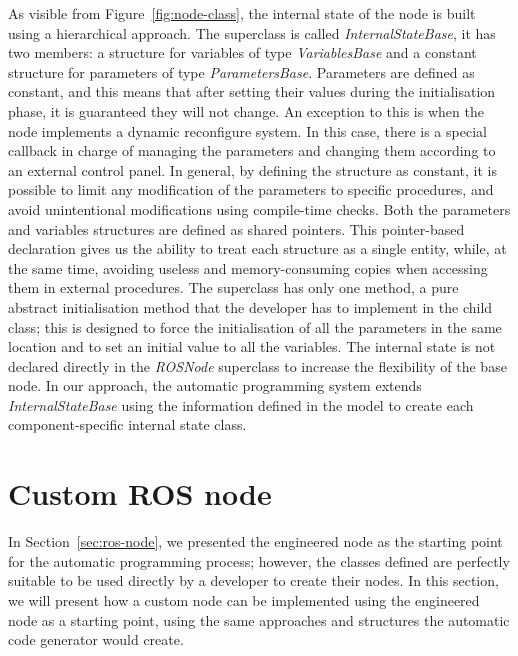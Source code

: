 As visible from Figure~\ref{fig:node-class}, the internal state of the node is built using a hierarchical approach. The superclass is called \textit{InternalStateBase}, it has two members: a structure for variables of type \textit{VariablesBase} and a constant structure for parameters of type  \textit{ParametersBase}. Parameters are defined as constant, and this means that after setting their values during the initialisation phase, it is guaranteed they will not change. An exception to this is when the node implements a dynamic reconfigure system. In this case, there is a special callback in charge of managing the parameters and changing them according to an external control panel. In general, by defining the structure as constant, it is possible to limit any modification of the parameters to specific procedures, and avoid unintentional modifications using compile-time checks. Both the parameters and variables structures are defined as shared pointers. This pointer-based declaration gives us the ability to treat each structure as a single entity, while, at the same time, avoiding useless and memory-consuming copies when accessing them in external procedures. The superclass has only one method, a pure abstract initialisation method that the developer has to implement in the child class; this is designed to force the initialisation of all the parameters in the same location and to set an initial value to all the variables. The internal state is not declared directly in the \textit{ROSNode} superclass to increase the flexibility of the base node. In our approach, the automatic programming system extends \textit{InternalStateBase} using the information defined in the model to create each component-specific internal state class.

\section{Custom ROS node}
In Section~\ref{sec:ros-node}, we presented the engineered node as the starting point for the automatic programming process; however, the classes defined are perfectly suitable to be used directly by a developer to create their nodes. In this section, we will present how a custom node can be implemented using the engineered node as a starting point, using the same approaches and structures the automatic code generator would create.

